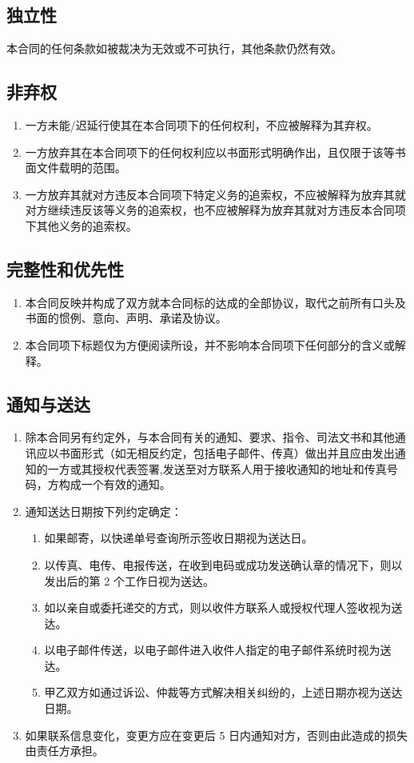 \subsection{独立性}
本合同的任何条款如被裁决为无效或不可执行，其他条款仍然有效。

\subsection{非弃权}
\begin{enumerate}
  \item 一方未能/迟延行使其在本合同项下的任何权利，不应被解释为其弃权。
  \item 一方放弃其在本合同项下的任何权利应以书面形式明确作出，且仅限于该等书面文件载明的范围。
  \item 一方放弃其就对方违反本合同项下特定义务的追索权，不应被解释为放弃其就对方继续违反该等义务的追索权，也不应被解释为放弃其就对方违反本合同项下其他义务的追索权。
\end{enumerate}

\subsection{完整性和优先性}
\begin{enumerate}
  \item 本合同反映并构成了双方就本合同标的达成的全部协议，取代之前所有口头及书面的惯例、意向、声明、承诺及协议。
  \item 本合同项下标题仅为方便阅读所设，并不影响本合同项下任何部分的含义或解释。
\end{enumerate}

\subsection{通知与送达}
\begin{enumerate}
  \item 除本合同另有约定外，与本合同有关的通知、要求、指令、司法文书和其他通讯应以书面形式（如无相反约定，包括电子邮件、传真）做出并且应由发出通知的一方或其授权代表签署,发送至对方联系人用于接收通知的地址和传真号码，方构成一个有效的通知。
  \item 通知送达日期按下列约定确定：
    \begin{enumerate}
      \item 如果邮寄，以快递单号查询所示签收日期视为送达日。
      \item 以传真、电传、电报传送，在收到电码或成功发送确认章的情况下，则以发出后的第 2 个工作日视为送达。
      \item 如以亲自或委托递交的方式，则以收件方联系人或授权代理人签收视为送达。
      \item 以电子邮件传送，以电子邮件进入收件人指定的电子邮件系统时视为送达。
      \item 甲乙双方如通过诉讼、仲裁等方式解决相关纠纷的，上述日期亦视为送达日期。
    \end{enumerate}
  \item 如果联系信息变化，变更方应在变更后 5 日内通知对方，否则由此造成的损失由责任方承担。
\end{enumerate}
